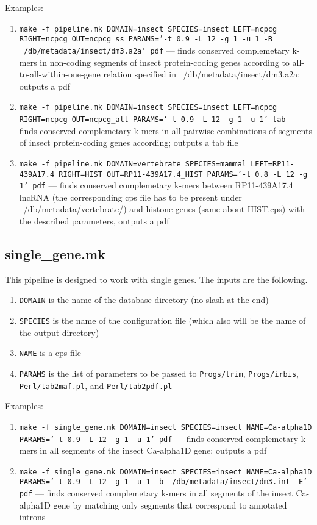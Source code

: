 \documentclass{article}
\begin{document}
Examples:
\begin{enumerate}
\item {\tt make -f pipeline.mk DOMAIN=insect SPECIES=insect LEFT=ncpcg RIGHT=ncpcg OUT=ncpcg\_ss PARAMS='-t 0.9 -L 12 -g 1 -u 1 -B ~/db/metadata/insect/dm3.a2a' pdf} --- finds conserved complemetary k-mers in non-coding segments of insect protein-coding genes according to all-to-all-within-one-gene relation specified in ~/db/metadata/insect/dm3.a2a; outputs a pdf
\item {\tt make -f pipeline.mk DOMAIN=insect SPECIES=insect LEFT=ncpcg RIGHT=ncpcg OUT=ncpcg\_all PARAMS='-t 0.9 -L 12 -g 1 -u 1' tab} --- finds conserved complemetary k-mers in all pairwise combinations of segments of insect protein-coding genes according; outputs a tab file
\item {\tt make -f pipeline.mk DOMAIN=vertebrate SPECIES=mammal LEFT=RP11-439A17.4 RIGHT=HIST OUT=RP11-439A17.4\_HIST PARAMS='-t 0.8 -L 12 -g 1' pdf} --- finds conserved complemetary k-mers between RP11-439A17.4 lncRNA (the corresponding cps file has to be present under ~/db/metadata/vertebrate/) and histone genes (same about HIST.cps) with the described parameters, outputs a pdf
\end{enumerate}

\subsection{single\_gene.mk}
This pipeline is designed to work with single genes. The inputs are the following.
\begin{enumerate}
\item {\tt DOMAIN} is the name of the database directory (no slash at the end)
\item {\tt SPECIES} is the name of the configuration file (which also will be the name of the output directory)
\item {\tt NAME} is a cps file
\item {\tt PARAMS} is the list of parameters to be passed to {\tt Progs/trim}, {\tt Progs/irbis}, {\tt Perl/tab2maf.pl}, and {\tt Perl/tab2pdf.pl}
\end{enumerate}

Examples:
\begin{enumerate}
\item {\tt make -f single\_gene.mk DOMAIN=insect SPECIES=insect NAME=Ca-alpha1D PARAMS='-t 0.9 -L 12 -g 1 -u 1' pdf} --- finds conserved complemetary k-mers in all segments of the insect Ca-alpha1D gene; outputs a pdf
\item {\tt make -f single\_gene.mk DOMAIN=insect SPECIES=insect NAME=Ca-alpha1D PARAMS='-t 0.9 -L 12 -g 1 -u 1 -b ~/db/metadata/insect/dm3.int -E' pdf} --- finds conserved complemetary k-mers in all segments of the insect Ca-alpha1D gene by matching only segments that correspond to annotated introns
\end{enumerate}
\end{document}

